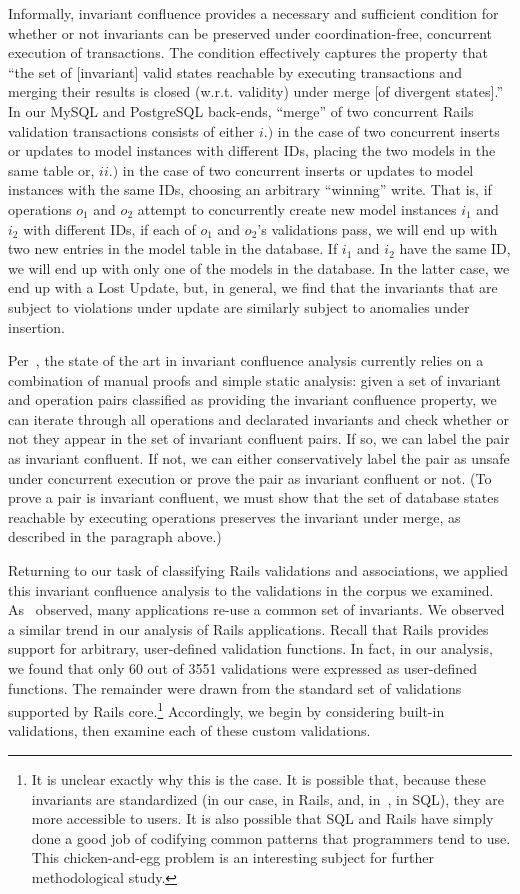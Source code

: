 Informally, invariant confluence provides a necessary and sufficient
condition for whether or not invariants can be preserved under
coordination-free, concurrent execution of transactions. The condition
effectively captures the property that ``the set of [invariant] valid
states reachable by executing transactions and merging their results
is closed (w.r.t. validity) under merge [of divergent states].'' In
our MySQL and PostgreSQL back-ends, ``merge'' of two concurrent Rails
validation transactions consists of either $i.)$ in the case of two
concurrent inserts or updates to model instances with different IDs,
placing the two models in the same table or, $ii.)$ in the case of two
concurrent inserts or updates to model instances with the same IDs,
choosing an arbitrary ``winning'' write. That is, if operations $o_1$
and $o_2$ attempt to concurrently create new model instances $i_1$ and
$i_2$ with different IDs, if each of $o_1$ and $o_2$'s validations
pass, we will end up with two new entries in the model table in the
database. If $i_1$ and $i_2$ have the same ID, we will end up with
only one of the models in the database. In the latter case, we end up
with a Lost Update, but, in general, we find that the invariants that
are subject to violations under update are similarly subject to
anomalies under insertion.

Per~\cite{coord-avoid}, the state of the art in invariant confluence
analysis currently relies on a combination of manual proofs and simple
static analysis: given a set of invariant and operation pairs
classified as providing the invariant confluence property, we can
iterate through all operations and declarated invariants and check
whether or not they appear in the set of invariant confluent pairs. If
so, we can label the pair as invariant confluent. If not, we can
either conservatively label the pair as unsafe under concurrent
execution or prove the pair as invariant confluent or not. (To prove a
pair is invariant confluent, we must show that the set of database
states reachable by executing operations preserves the invariant under
merge, as described in the paragraph above.)

Returning to our task of classifying Rails validations and
associations, we applied this invariant confluence analysis to the
validations in the corpus we examined. As~\cite{coord-avoid} observed,
many applications re-use a common set of invariants. We observed a
similar trend in our analysis of Rails applications. Recall that Rails
provides support for arbitrary, user-defined validation functions. In
fact, in our analysis, we found that only 60 out of 3551 validations
were expressed as user-defined functions. The remainder were drawn
from the standard set of validations supported by Rails
core.\footnote{It is unclear exactly why this is the case. It is
  possible that, because these invariants are standardized (in our
  case, in Rails, and, in~\cite{coord-avoid}, in SQL), they are more
  accessible to users. It is also possible that SQL and Rails have
  simply done a good job of codifying common patterns that programmers
  tend to use. This chicken-and-egg problem is an interesting subject
  for further methodological study.} Accordingly, we begin by
considering built-in validations, then examine each of these custom
validations.

